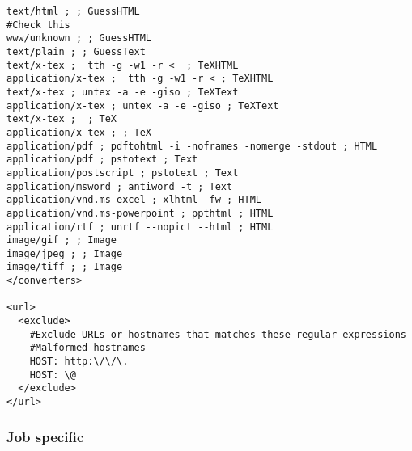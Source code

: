 \begin{verbatim}
text/html ; ; GuessHTML
#Check this
www/unknown ; ; GuessHTML
text/plain ; ; GuessText
text/x-tex ;  tth -g -w1 -r <  ; TeXHTML
application/x-tex ;  tth -g -w1 -r < ; TeXHTML
text/x-tex ; untex -a -e -giso ; TeXText
application/x-tex ; untex -a -e -giso ; TeXText
text/x-tex ;  ; TeX
application/x-tex ; ; TeX
application/pdf ; pdftohtml -i -noframes -nomerge -stdout ; HTML
application/pdf ; pstotext ; Text
application/postscript ; pstotext ; Text
application/msword ; antiword -t ; Text
application/vnd.ms-excel ; xlhtml -fw ; HTML
application/vnd.ms-powerpoint ; ppthtml ; HTML
application/rtf ; unrtf --nopict --html ; HTML
image/gif ; ; Image
image/jpeg ; ; Image
image/tiff ; ; Image
</converters>

<url>
  <exclude>
    #Exclude URLs or hostnames that matches these regular expressions
    #Malformed hostnames
    HOST: http:\/\/\.
    HOST: \@
  </exclude>
</url>
\end{verbatim}
\subsubsection{Job specific}

